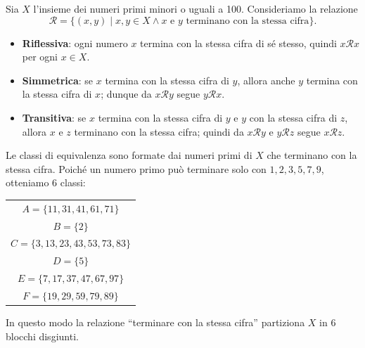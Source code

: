 







\begin{esempio}
Sia $X$ l'insieme dei numeri primi minori o uguali a 100. Consideriamo la relazione
\[
\mathcal{R}=\{(x,y) \mid x,y \in X \land x \text{ e } y \text{ terminano con la stessa cifra}\}.
\]

\begin{itemize}
    \item \textbf{Riflessiva}: ogni numero $x$ termina con la stessa cifra di sé stesso, quindi
          $x \mathcal{R} x$ per ogni $x \in X$.
    \item \textbf{Simmetrica}: se $x$ termina con la stessa cifra di $y$, allora anche $y$ termina
          con la stessa cifra di $x$; dunque da $x \mathcal{R} y$ segue $y \mathcal{R} x$.
    \item \textbf{Transitiva}: se $x$ termina con la stessa cifra di $y$ e $y$ con la stessa cifra
          di $z$, allora $x$ e $z$ terminano con la stessa cifra; quindi da
          $x \mathcal{R} y$ e $y \mathcal{R} z$ segue $x \mathcal{R} z$.
\end{itemize}

Le classi di equivalenza sono formate dai numeri primi di $X$ che terminano con la stessa cifra.
Poiché un numero primo può terminare solo con $1,2,3,5,7,9$, otteniamo 6 classi:

\begin{center}
\begin{tabular}{c}
$A = \{11,31,41,61,71\}$\\
$B = \{2\}$\\
$C = \{3,13,23,43,53,73,83\}$\\
$D = \{5\}$\\
$E = \{7,17,37,47,67,97\}$\\
$F = \{19,29,59,79,89\}$\\
\end{tabular}
\end{center}

In questo modo la relazione “terminare con la stessa cifra” partiziona $X$ in 6 blocchi disgiunti.
\end{esempio}










